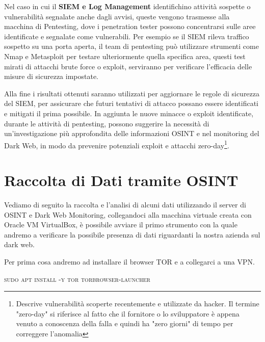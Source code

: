 Nel caso in cui il \textbf{SIEM e Log Management} identifichino attività sospette o vulnerabilità segnalate anche dagli avvisi, queste vengono trasmesse alla macchina di Pentesting, dove i penetration tester possono concentrarsi sulle aree identificate e segnalate come vulnerabili.
Per esempio se il SIEM rileva traffico sospetto su una porta aperta, il team di pentesting può utilizzare strumenti come Nmap e Metasploit per testare ulteriormente quella specifica area, questi test mirati di attacchi brute force o exploit, serviranno per verificare l'efficacia delle misure di sicurezza impostate.

Alla fine i risultati ottenuti saranno utilizzati per aggiornare le regole di sicurezza del SIEM, per assicurare che futuri tentativi di attacco possano essere identificati e mitigati il prima possibile.
In aggiunta le nuove minacce o exploit identificate, durante le attività di pentesting, possono suggerire la necessità di un'investigazione più approfondita delle informazioni OSINT e nel monitoring del Dark Web, in modo da prevenire potenziali exploit e attacchi zero-day\footnote{Descrive vulnerabilità scoperte recentemente e utilizzate da hacker. Il termine "zero-day" si riferisce al fatto che il fornitore o lo sviluppatore è appena venuto a conoscenza della falla e quindi ha "zero giorni" di tempo per correggere l'anomalia}.


\section{Raccolta di Dati tramite OSINT}\label{sec:cap_sec_caso3}

Vediamo di seguito la raccolta e l'analisi di alcuni dati utilizzando il server di OSINT e Dark Web Monitoring, collegandoci alla macchina virtuale creata con Oracle VM VirtualBox, è possibile avviare il primo strumento con la quale andremo a verificare la possibile presenza di dati riguardanti la nostra azienda sul dark web.

Per prima cosa andremo ad installare il browser TOR e a collegarci a una VPN.

    \begin{tcolorbox}
\textsc{sudo apt install -y tor torbrowser-launcher}
    \end{tcolorbox}

